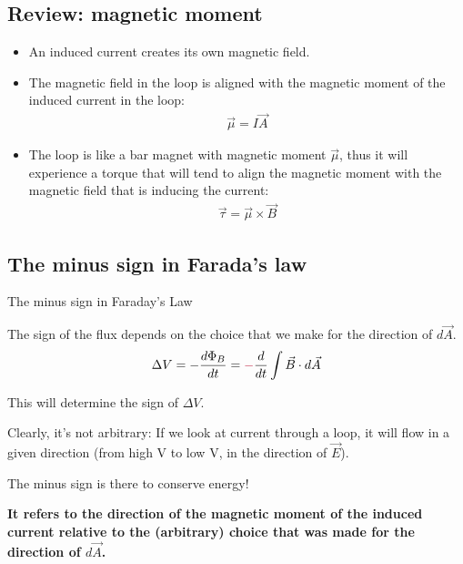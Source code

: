 \documentclass[aspectratio=169,
hyperref={colorlinks,urlcolor=blue}
]{beamer}
\begin{document}
\subsection{Review: magnetic moment}
\label{subsec:reviewmagneticmoment}
{
\begin{itemize}
\item An induced current creates its own magnetic field.
\item The magnetic field in the loop is aligned with the magnetic moment of the induced current in the loop:
\begin{align*}
\vec\mu=I\vec A
\end{align*}
\item The loop is like a bar magnet with magnetic moment $\vec\mu$, thus it will experience a torque that will tend to align the magnetic moment with the magnetic field that is inducing the current:
\begin{align*}
\vec\tau = \vec\mu \times \vec B
\end{align*}
\end{itemize}

}
{
\vspace{-1.5cm}
\vspace{-0.5cm}
}


\subsection{The minus sign in Farada's law}
\label{subsec:theminussigninfaradayslaw}
\begin{bulletframe}{The minus sign in Faraday's Law}
\item The sign of the flux depends on the choice that we make for the direction of $d\vec A$.
\begin{align*}
\Delta V = -\frac{d\Phi_B}{dt}=\textcolor{qred}{-}\frac{d}{dt}\int \vec B \cdot d\vec A
\end{align*}
\item This will determine the sign of $\Delta V$.
\item Clearly, it's not arbitrary: If we look at current through a loop, it will flow in a given direction (from high V to low V, in the direction of $\vec E$).
\item The minus sign is there to conserve energy!
\item \textbf{It refers to the direction of the magnetic moment of the induced current relative to the (arbitrary) choice that was made for the direction of $d\vec A$.}
\end{bulletframe}
\end{document}
